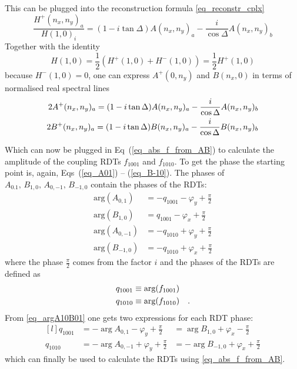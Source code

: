 %
This can be plugged into the reconstruction formula \eqref{eq_reconstr_cplx}
%
\begin{equation}
    \frac{H^+(n_x,n_y)_a}{H(1,0)_i} = (1-i\tan\Delta)A(n_x,n_y)_a - \frac{i}{\cos\Delta}A(n_x,n_y)_b
    \label{eq_reconstr_from_norm}
\end{equation}
%
Together with the identity
%
\begin{equation}
    H(1,0) = \frac{1}{2} \left( H^+(1,0) + {H^-(1,0)}\right) = \frac{1}{2}H^+(1,0)
\end{equation}
%
because $H^-(1,0) = 0$, one can express $A^+(0,n_y)$ and $B(n_x, 0)$ in terms of normalised real spectral lines
%
\begin{align}
    2A^+(n_x,n_y)_a = (1-i\tan\Delta)A(n_x,n_y)_a - \frac{i}{\cos\Delta}A(n_x,n_y)_b \notag \\
    2B^+(n_x,n_y)_a = (1-i\tan\Delta)B(n_x,n_y)_a - \frac{i}{\cos\Delta}B(n_x,n_y)_b
    \label{eq_recon_AB}
\end{align}
%

Which can now be plugged in Eq~(\ref{eq_abs_f_from_AB}) to calculate the amplitude of the coupling RDTs
$f_{1001}$ and $f_{1010}$. To get the phase the starting point is, again, Eqs~(\ref{eq_A01}) -- (\ref{eq_B-10}).
The phases of $A_{0.1},\,B_{1,0},\,A_{0,-1},\,B_{-1,0}$ contain the phases of the RDTs:
%
\begin{align}
  \text{arg}(A_{0,1}) &= -q_{1001} -\varphi_y +\tfrac{\pi}{2} \\
  \text{arg}(B_{1,0}) &= q_{1001} -\varphi_x +\tfrac{\pi}{2} \\
  \text{arg}(A_{0,-1}) &= -q_{1010} +\varphi_y +\tfrac{\pi}{2} \\
  \text{arg}(B_{-1,0}) &= -q_{1010} +\varphi_x +\tfrac{\pi}{2}
  \label{eq_argA10B01}
\end{align}
%
where the phase $\frac{\pi}{2}$ comes from the factor $i$ and the phases of the RDTs are defined as
%
\begin{align}
  q_{1001} &\equiv \text{arg}(f_{1001})\\
  q_{1010} &\equiv \text{arg}(f_{1010})
  \quad .
  \label{eq_arg_f1001}
\end{align}
%
From \eqref{eq_argA10B01} one gets two expressions for each RDT phase:
%
\begin{equation}
  \begin{matrix*}[l]
  q_{1001} &= -\arg{A_{0,1}}-\varphi_y + \tfrac{\pi}{2} &= \arg{B_{1,0}}+\varphi_x -\tfrac{\pi}{2}\\
  q_{1010} &= -\arg{A_{0,-1}} +\varphi_y + \tfrac{\pi}{2} &= -\arg{B_{-1,0}}+\varphi_x +\tfrac{\pi}{2}
  \label{eq_q1001q1010}
  \end{matrix*}
\end{equation}
%
which can finally be used to calculate the RDTs using \eqref{eq_abs_f_from_AB}.

